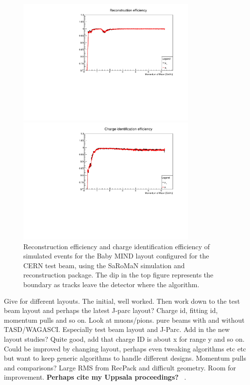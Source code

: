 \begin{figure}[h!]
\centering
\includegraphics[width=0.8\textwidth]{figures/oldStudies/FullFitted.pdf}

\includegraphics[width=0.8\textwidth]{figures/oldStudies/FullChargeID.pdf}
\caption{Reconstruction efficiency and charge identification efficiency of simulated events for the Baby MIND layout configured for the CERN test beam, using the SaRoMaN simulation and reconstruction package. The dip in the top figure represents the boundary as tracks leave the detector where the algorithm.}
\label{fig:TestBeamMIND2}
\end{figure}

Give for different layouts. The initial, well worked. Then work down to the test beam layout and perhaps the latest J-parc layout? 
Charge id, fitting id, momentum pulls and so on.
Look at muons/pions. pure beams with and without TASD/WAGASCI. Especially test beam layout and J-Parc.
Add in the new layout studies?
Quite good, add that charge ID is about x for range y and so on.  Could be improved by changing layout, perhaps even tweaking algorithms etc etc but want to keep generic algorithms to handle different designs.
Momentum pulls and comparisons? Large RMS from RecPack and difficult geometry. Room for improvement.
\textbf{Perhaps cite my Uppsala proceedings?} ~\cite{82Uppsala}.
\fi

